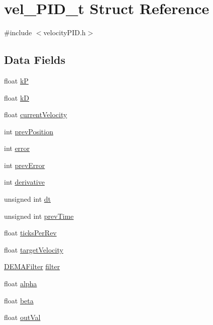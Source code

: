 \hypertarget{structvel___p_i_d__t}{}\section{vel\+\_\+\+P\+I\+D\+\_\+t Struct Reference}
\label{structvel___p_i_d__t}


{\ttfamily \#include $<$velocity\+P\+I\+D.\+h$>$}

\subsection*{Data Fields}
\begin{DoxyCompactItemize}
\item 
float \hyperlink{structvel___p_i_d__t_a14be13da4741d38ffba7a0df6c66d1e3}{kP}
\item 
float \hyperlink{structvel___p_i_d__t_ac2f3bc9698f984609f6e0c457f1d0b10}{kD}
\item 
float \hyperlink{structvel___p_i_d__t_a361bcf98cb0bc31b2e124f5b0670bb34}{current\+Velocity}
\item 
int \hyperlink{structvel___p_i_d__t_abc2c6a4d770ae797b1ce16b3b13cd746}{prev\+Position}
\item 
int \hyperlink{structvel___p_i_d__t_a476dd4273877a1b66b68453ff5b7f1eb}{error}
\item 
int \hyperlink{structvel___p_i_d__t_a201d7c4b20641f37b6d4d91b57ca8e6d}{prev\+Error}
\item 
int \hyperlink{structvel___p_i_d__t_a758df10e0dc22cdcdf015d70f3404b1e}{derivative}
\item 
unsigned int \hyperlink{structvel___p_i_d__t_acbbe0b9cfec8342c99fdf7d101709a81}{dt}
\item 
unsigned int \hyperlink{structvel___p_i_d__t_af8d75a809f5af8874514a1800eff5304}{prev\+Time}
\item 
float \hyperlink{structvel___p_i_d__t_ad8f6158e9b8be0168e25e27577f6f9e1}{ticks\+Per\+Rev}
\item 
float \hyperlink{structvel___p_i_d__t_ad15506c50e8319a1ddd20eabd1731ebf}{target\+Velocity}
\item 
\hyperlink{filter_8h_a7dde035e516b0067d35e0a4580bec1f5}{D\+E\+M\+A\+Filter} \hyperlink{structvel___p_i_d__t_a909e2fdfc8d5b43ffdcabfe50b0c4512}{filter}
\item 
float \hyperlink{structvel___p_i_d__t_aa43c6fd74cebf6e2a7a4a84103847766}{alpha}
\item 
float \hyperlink{structvel___p_i_d__t_a1c2d07b2cff55945e9d0652965f5dd28}{beta}
\item 
float \hyperlink{structvel___p_i_d__t_a2e5a26e2d2d0174d39abf65610c5b9aa}{out\+Val}
\end{DoxyCompactItemize}


